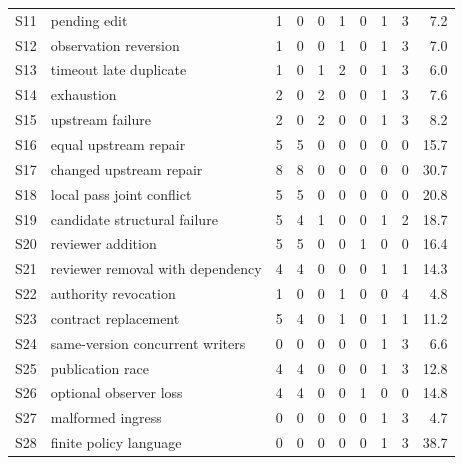\documentclass[pdflatex,sn-mathphys-num]{sn-jnl}
\theoremstyle{thmstyleone}
\theoremstyle{thmstylethree}
\theoremstyle{thmstyletwo}
\begin{document}
{\begin{longtable}{@{}lp{3.0cm}rrrrrrrr@{}}
S11 & pending edit & 1 & 0 & 0 & 1 & 0 & 1 & 3 & 7.2\\

S12 & observation reversion & 1 & 0 & 0 & 1 & 0 & 1 & 3 & 7.0\\

S13 & timeout late duplicate & 1 & 0 & 1 & 2 & 0 & 1 & 3 & 6.0\\

S14 & exhaustion & 2 & 0 & 2 & 0 & 0 & 1 & 3 & 7.6\\

S15 & upstream failure & 2 & 0 & 2 & 0 & 0 & 1 & 3 & 8.2\\

S16 & equal upstream repair & 5 & 5 & 0 & 0 & 0 & 0 & 0 & 15.7\\

S17 & changed upstream repair & 8 & 8 & 0 & 0 & 0 & 0 & 0 & 30.7\\

S18 & local pass joint conflict & 5 & 5 & 0 & 0 & 0 & 0 & 0 & 20.8\\

S19 & candidate structural failure & 5 & 4 & 1 & 0 & 0 & 1 & 2 & 18.7\\

S20 & reviewer addition & 5 & 5 & 0 & 0 & 1 & 0 & 0 & 16.4\\

S21 & reviewer removal with dependency & 4 & 4 & 0 & 0 & 0 & 1 & 1 & 14.3\\

S22 & authority revocation & 1 & 0 & 0 & 1 & 0 & 0 & 4 & 4.8\\

S23 & contract replacement & 5 & 4 & 0 & 1 & 0 & 1 & 1 & 11.2\\

S24 & same-version concurrent writers & 0 & 0 & 0 & 0 & 0 & 1 & 3 & 6.6\\

S25 & publication race & 4 & 4 & 0 & 0 & 0 & 1 & 3 & 12.8\\

S26 & optional observer loss & 4 & 4 & 0 & 0 & 1 & 0 & 0 & 14.8\\

S27 & malformed ingress & 0 & 0 & 0 & 0 & 0 & 1 & 3 & 4.7\\

S28 & finite policy language & 0 & 0 & 0 & 0 & 0 & 1 & 3 & 38.7\\

\end{longtable}}
\end{document}
